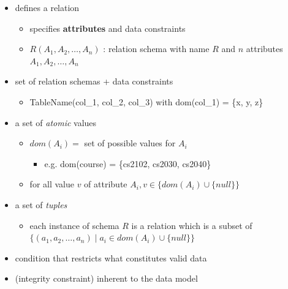 \documentclass[10pt, landscape]{article}
\begin{document}
\begin{multicols}{4}
  \begin{itemize}
    \item {} defines a relation 
      \begin{itemize}
        \item specifies \textbf{attributes} and data constraints
        \item $ R(A_1, A_2, \dots, A_n) $ : relation schema with name $ R $ and $ n $ attributes $ A_1, A_2, \dots, A_n $
      \end{itemize}
    \item {} set of relation schemas + data constraints
      \begin{itemize}
        \item TableName(col\_1, col\_2, col\_3) with dom(col\_1) = \{x, y, z\}
      \end{itemize}
    \item {} a set of \textit{atomic} values 
      \begin{itemize}
        \item $ dom(A_i) =$ set of possible values for $ A_i $
          \begin{itemize}
            \item e.g. dom(course) = \{cs2102, cs2030, cs2040\}
          \end{itemize}
        \item for all value $ v $ of attribute $ A_i, v \in \{ dom(A_i) \cup \{null\} \} $ 
      \end{itemize}
    \item {} a set of \textit{tuples} 
      \begin{itemize}
        \item each instance of schema $ R $ is a relation which is a subset of $ \{(a_1, a_2, \dots, a_n) \mid a_i \in dom(A_i) \cup \{null\}\} $
      \end{itemize}
    \item {} condition that restricts what constitutes valid data
    \item {} (integrity constraint) inherent to the data model 
  \end{itemize}


\end{multicols}
\end{document}
